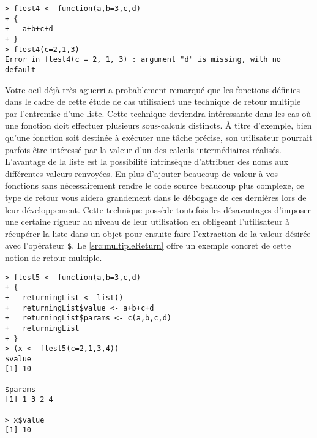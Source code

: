 \begin{lstlisting}[caption = L'assignation et les valeurs par défaut,label=src:assignPositionalDefault]
> ftest4 <- function(a,b=3,c,d)
+ {
+   a+b+c+d
+ }
> ftest4(c=2,1,3)
Error in ftest4(c = 2, 1, 3) : argument "d" is missing, with no default
\end{lstlisting}

\vspace{\baselineskip}
Votre oeil déjà très aguerri a probablement remarqué que les fonctions définies dans le cadre de cette étude de cas utilisaient une technique de retour multiple par l'entremise d'une liste. Cette technique deviendra intéressante dans les cas où une fonction doit effectuer plusieurs sous-calculs distincts. À titre d'exemple, bien qu'une fonction soit destinée à exécuter une tâche précise, son utilisateur pourrait parfois être intéressé par la valeur d'un des calculs intermédiaires réalisés. L'avantage de la liste est la possibilité intrinsèque d'attribuer des noms aux différentes valeurs renvoyées. En plus d'ajouter beaucoup de valeur à vos fonctions sans nécessairement rendre le code source beaucoup plus complexe, ce type de retour vous aidera grandement dans le débogage de ces dernières lors de leur développement. Cette technique possède toutefois les désavantages d'imposer une certaine rigueur au niveau de leur utilisation en obligeant l'utilisateur à récupérer la liste dans un objet pour ensuite faire l'extraction de la valeur désirée avec l'opérateur \texttt{\$}. Le \autoref{src:multipleReturn} offre un exemple concret de cette notion de retour multiple.

\begin{lstlisting}[caption = Retour multiple par l'entremise d'une liste,label=src:multipleReturn]
> ftest5 <- function(a,b=3,c,d)
+ {
+   returningList <- list()
+   returningList$value <- a+b+c+d
+   returningList$params <- c(a,b,c,d)
+   returningList
+ }
> (x <- ftest5(c=2,1,3,4))
$value
[1] 10

$params
[1] 1 3 2 4

> x$value
[1] 10
\end{lstlisting}

